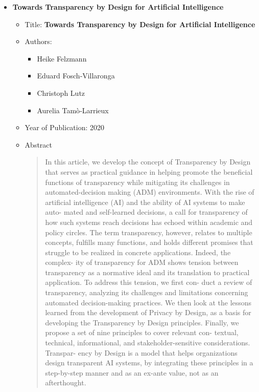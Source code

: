 \documentclass{article}
\begin{document}
\begin{itemize}
        \item \textbf{Towards Transparency by Design for Artificial Intelligence}
        \begin{itemize}
            \item Title: \textbf{Towards Transparency by Design for Artificial Intelligence}
            \item Authors:
            \begin{itemize}
                \item Heike Felzmann
                \item Eduard Fosch‑Villaronga
                \item Christoph Lutz
                \item Aurelia Tamò‑Larrieux
            \end{itemize}
            \item Year of Publication: 2020
            \item Abstract
            \begin{abstract}
                In  this  article,  we  develop  the  concept  of  Transparency  by  Design  that  serves  as  
                practical guidance in helping promote the beneficial functions of transparency while  
                mitigating its challenges in automated-decision making (ADM) environments. With 
                the  rise  of  artificial  intelligence  (AI)  and  the  ability  of  AI  systems  to  make  auto-
                mated and self-learned decisions, a call for transparency of how such systems reach 
                decisions  has  echoed  within  academic  and  policy  circles.  The  term  transparency,  
                however,  relates  to  multiple  concepts,  fulfills  many  functions,  and  holds  different  
                promises that struggle to be realized in concrete applications. Indeed, the complex-
                ity  of  transparency  for  ADM  shows  tension  between  transparency  as  a  normative  
                ideal and its translation to practical application. To address this tension, we first con-
                duct  a  review  of  transparency,  analyzing  its  challenges  and  limitations  concerning  
                automated decision-making practices. We then look at the lessons learned from the 
                development  of  Privacy  by  Design,  as  a  basis  for  developing  the  Transparency  by  
                Design principles. Finally, we propose a set of nine principles to cover relevant con-
                textual, technical, informational, and stakeholder-sensitive considerations. Transpar-
                ency  by  Design  is  a  model  that  helps  organizations  design  transparent  AI  systems,  
                by integrating these principles in a step-by-step manner and as an ex-ante value, not 
                as an afterthought.
            \end{abstract}
        \end{itemize}
    \end{itemize}
\end{document}
